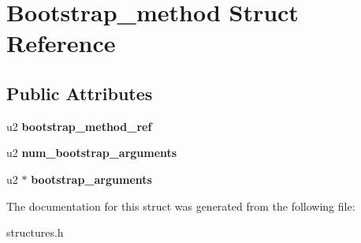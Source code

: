 \hypertarget{structBootstrap__method}{}\section{Bootstrap\+\_\+method Struct Reference}
\label{structBootstrap__method}
\subsection*{Public Attributes}
\begin{DoxyCompactItemize}
\item 
u2 {\bfseries bootstrap\+\_\+method\+\_\+ref}\hypertarget{structBootstrap__method_a07ab37cf19bc567885052f4160dc2018}{}\label{structBootstrap__method_a07ab37cf19bc567885052f4160dc2018}

\item 
u2 {\bfseries num\+\_\+bootstrap\+\_\+arguments}\hypertarget{structBootstrap__method_a492a9b7d938c1c6d98b7100530c3dfc1}{}\label{structBootstrap__method_a492a9b7d938c1c6d98b7100530c3dfc1}

\item 
u2 $\ast$ {\bfseries bootstrap\+\_\+arguments}\hypertarget{structBootstrap__method_ab53d18c059e8ebe5e90ec64cafc2361f}{}\label{structBootstrap__method_ab53d18c059e8ebe5e90ec64cafc2361f}

\end{DoxyCompactItemize}


The documentation for this struct was generated from the following file\+:\begin{DoxyCompactItemize}
\item 
structures.\+h\end{DoxyCompactItemize}
